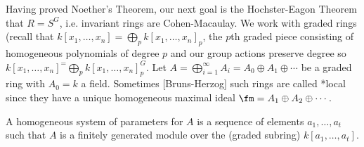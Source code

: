 Having proved Noether's Theorem, our next goal is the Hochster-Eagon Theorem that $R= S^G$, i.e. invariant rings are Cohen-Macaulay. We work with graded rings (recall that $k[x_1,\ldots,x_n]= \bigoplus_p k[x_1,\ldots,x_n]_p$, the $p$th graded piece consisting of homogeneous polynomials of degree $p$ and our group actions preserve degree so $k[x_1,\ldots,x_n]^= \bigoplus_p k[x_1,\ldots,x_n]_p^G$. Let $A= \bigoplus_{i=1}^\infty A_i= A_0 \oplus A_1 \oplus \cdots$ be a graded ring with $A_0= k$ a field. Sometimes [Bruns-Herzog] such rings are called *local since they have a unique homogeneous maximal ideal $\fm= A_1 \oplus A_2 \oplus \cdots$. 


\begin{dfn}
A homogeneous system of parameters for $A$ is a sequence of elements $a_1,\ldots,a_t$ such that $A$ is a finitely generated module over the (graded subring) $k[a_1,\ldots,a_t]$. 
\end{dfn}




































